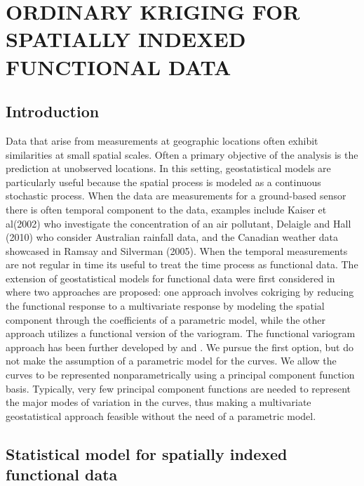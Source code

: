 
\chapter{ORDINARY KRIGING FOR SPATIALLY INDEXED FUNCTIONAL DATA}
\label{ch:functional kriging}

\section{Introduction} %
\label{sec:introduction}

Data that arise from measurements at geographic locations often exhibit similarities at small spatial scales. Often a primary objective of the analysis is the prediction at unobserved locations. In this setting, geostatistical models are particularly useful because the spatial process is modeled as a continuous stochastic process. When the data are measurements for a ground-based sensor there is often temporal component to the data, examples include Kaiser et al(2002) who investigate the concentration of an air pollutant, Delaigle and Hall (2010) who consider Australian rainfall data, and the Canadian weather data showcased in Ramsay and Silverman (2005). When the temporal measurements are not regular in time its useful to treat the time process as functional data. The extension of geostatistical models for functional data were first considered in \cite{Goulard:1993} where two approaches are proposed:  one approach involves cokriging by reducing the functional response to a multivariate response by modeling the spatial component through the coefficients of a parametric model, while the other approach utilizes a functional version of the variogram.  The functional variogram approach has been further developed by \cite{Giraldo:2010jx} and \cite{Nerini:2010ba}. We pursue the first option, but do not make the assumption of a parametric model for the curves. We allow the curves to be represented nonparametrically using a principal component function basis. Typically, very few principal component functions are needed to represent the major modes of variation in the curves, thus making a multivariate geostatistical approach feasible without the need of a parametric model. 

\section{Statistical model for spatially indexed functional data} %
\label{sec:statistical_model_for_spatially_indexed_functional_data}

